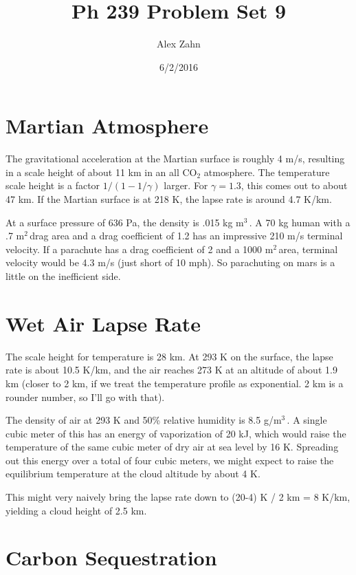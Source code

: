 \documentclass[12pt]{article}
\title{Ph 239 Problem Set 9}
\author{Alex Zahn}
\date{6/2/2016}
\begin{document}
\maketitle

\newcommand{\wmsq}{W/\(\mathrm{m}^2\,\)}
\newcommand{\msq}{\(\mathrm{m}^2\,\)}
\newcommand{\micron}{\(\mu\mathrm{m}\)\,}
\newcommand{\mcb}{\(\mathrm{m}^3\,\)}

\section{Martian Atmosphere}

The gravitational acceleration at the Martian surface is roughly 4 m/s, resulting in a scale height of about 11 km in an all CO\(_2\) atmosphere. The temperature scale height is a factor \(1/(1-1/\gamma)\) larger. For \(\gamma = 1.3\), this comes out to about 47 km. If the Martian surface is at 218 K, the lapse rate is around 4.7 K/km.

At a surface pressure of 636 Pa, the density is .015 kg \mcb. A 70 kg human with a .7 \msq drag area and a drag coefficient of 1.2 has an impressive 210 m/s terminal velocity. If a parachute has a drag coefficient of 2 and a 1000 \msq area, terminal velocity would be 4.3 m/s (just short of 10 mph). So parachuting on mars is a little on the inefficient side.

\section{Wet Air Lapse Rate}

The scale height for temperature is 28 km. At 293 K on the surface, the lapse rate is about 10.5 K/km, and the air reaches 273 K at an altitude of about 1.9 km (closer to 2 km, if we treat the temperature profile as exponential. 2 km is a rounder number, so I'll go with that).

The density of air at 293 K and 50\% relative humidity is 8.5 g/\mcb. A single cubic meter of this has an energy of vaporization of 20 kJ, which would raise the temperature of the same cubic meter of dry air at sea level by 16 K. Spreading out this energy over a total of four cubic meters, we might expect to raise the equilibrium temperature at the cloud altitude by about 4 K.

This might very naively bring the lapse rate down to (20-4) K / 2 km = 8 K/km, yielding a cloud height of 2.5 km.


\section{Carbon Sequestration}
\end{document}
